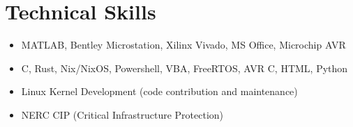 \documentclass{lsanche_cv}
\begin{document}
\section{Technical Skills}
\begin{itemize}
\item MATLAB, Bentley Microstation, Xilinx Vivado, MS Office, Microchip AVR
\item C, Rust, Nix/NixOS, Powershell, VBA, FreeRTOS, AVR C, HTML, Python
\item Linux Kernel Development (code contribution and maintenance)
\item NERC CIP (Critical Infrastructure Protection)
\end{itemize}
\end{document}
